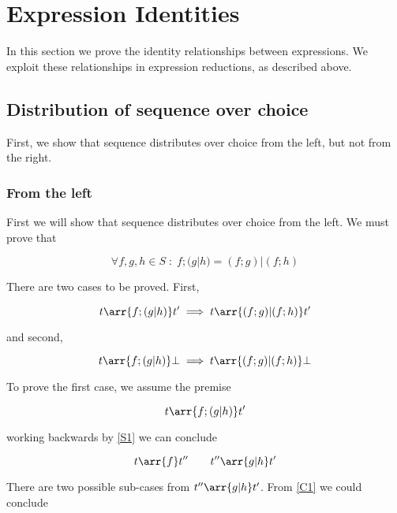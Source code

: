 
\section{Expression Identities}
\label{ch:expr-ids}

In this section we prove the identity relationships between
expressions. We exploit these relationships in expression
reductions, as described above.

\subsection{Distribution of sequence over choice}

First, we show that sequence distributes over choice from the
left, but not from the right.

\subsubsection{From the left}

First we will show that sequence distributes over choice from the
left. We must prove that

\begin{equation}
\forall f,g,h \in S \;:\; f;(g|h) = (f;g)|(f;h)
\end{equation}

There are two cases to be proved. First,

\begin{equation}
t \arr{f;(g|h)} t' \implies t \arr{(f;g)|(f;h)} t'
\end{equation}

and second,

\begin{equation}
t \arr{f;(g|h)} \bot \implies t \arr{(f;g)|(f;h)} \bot
\end{equation}

To prove the first case, we assume the premise

\begin{equation}
t \arr{f;(g|h)} t'
\end{equation}

working backwards by \eqref{S1} we can conclude

\begin{equation}
t \arr{f} t'' \qquad t'' \arr{g|h} t'
\end{equation}

There are two possible sub-cases from $t'' \arr{g|h} t'$. From
\eqref{C1} we could conclude

